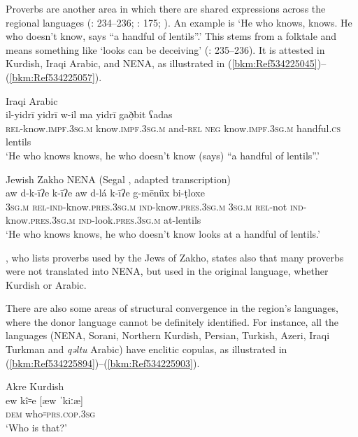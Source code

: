 \documentclass[output=paper]{langsci/langscibook}
\begin{document}
Proverbs are another area in which there are shared expressions across the regional languages (\citealt{Chyet1995}: 234–236; \citealt{Garbell1965}: 175; \citealt{Segal1955}). An example is ‘He who knows, knows. He who doesn’t know, says “a handful of lentils”.’ This stems from a folktale and means something like ‘looks can be deceiving’ (\citealt{Chyet1995}: 235–236). It is attested in Kurdish, Iraqi Arabic, and NENA, as illustrated in (\ref{bkm:Ref534225045})–(\ref{bkm:Ref534225057}).

\ea\label{bkm:Ref534225045}Iraqi Arabic \citep[235]{Chyet1995} \\
\gll il-yidrī   yidrī     w-il ma yidrī     gað̣bit ʕadas\\
    \textsc{rel}\textup{{}-know.}\textsc{impf.3sg.m} \textup{know.}\textsc{impf.3sg.m} \textup{and-}\textsc{rel} \textsc{neg} \textup{know.}\textsc{impf.3sg.m} handful\textsc{.cs} lentils\\
\glt ‘He who knows knows, he who doesn’t know (says) “a handful of lentils”.’\z

\ea\label{bkm:Ref534225057}Jewish Zakho NENA (Segal \citeyear[262]{Segal1955}, adapted transcription)\\
\gll aw d-k-īʔe   k-īʔe     aw d-lá k-īʔe   g-mēnüx bi-ṭloxe\\
    \textsc{3sg.m} \textsc{rel}\textup{{}-}\textsc{ind-}\textup{know}\textsc{.pres.3sg.m} \textsc{ind}\textup{{}-know.}\textsc{pres.3sg.m} \textsc{3sg.m} \textsc{rel}\textup{{}-not} \textsc{ind}\textup{{}-know.}\textsc{pres.3sg.m} \textsc{ind-}\textup{look.}\textsc{pres}.\textsc{3sg.m} \textup{at-lentils}\\
\glt ‘He who knows knows, he who doesn’t know looks at a handful of lentils.’\z

\citet{Sabar1978}, who lists proverbs used by the Jews of Zakho, states also that many proverbs were not translated into NENA, but used in the original language, whether Kurdish or Arabic.

There are also some areas of structural convergence in the region’s languages, where the donor language cannot be definitely identified. For instance, all the languages (NENA, Sorani, Northern Kurdish, Persian, Turkish, Azeri, Iraqi Turkman and \textit{qəltu} Arabic) have enclitic copulas, as illustrated in (\ref{bkm:Ref534225894})–(\ref{bkm:Ref534225903}).

\ea\label{bkm:Ref534225894}Akre Kurdish \citep[175]{MacKenzie1961}\\
\gll ew kî꞊e \textup{[æw ˈkiːæ]}\\
     \textsc{dem} who꞊\textsc{prs.cop.3sg}\\
\glt ‘Who is that?’ 
\z
\end{document}
